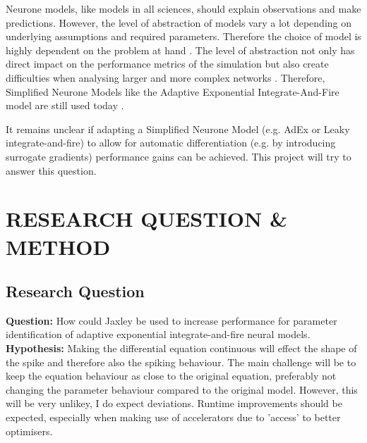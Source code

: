 \documentclass[11pt,a4paper]{article}
\begin{document}
Neurone models, like models in all sciences, should explain observations and make predictions. However, the level of abstraction of models vary a lot depending on underlying assumptions and required parameters.
Therefore the choice of model is highly dependent on the problem at hand \cite{Levenstein2023}.
The level of abstraction not only has direct impact on the performance metrics of the simulation but also create difficulties when analysing larger and more complex networks \cite{Gerstner2014}. 
Therefore, Simplified Neurone Models like the Adaptive Exponential Integrate-And-Fire \cite{Naud2008} model are still used today \cite{Tesler2024}.

It remains unclear if adapting a Simplified Neurone Model  (e.g. AdEx or Leaky integrate-and-fire) to allow for automatic differentiation (e.g. by introducing surrogate gradients) performance gains can be achieved.
This project will try to answer this question.

\section{RESEARCH QUESTION \& METHOD}

\subsection*{Research Question}
\textbf{Question:} How could Jaxley be used to increase performance for parameter identification of adaptive exponential integrate-and-fire neural models.\\
\textbf{Hypothesis:} Making the differential equation continuous will effect the shape of the spike and therefore also the spiking behaviour.
The main challenge will be to keep the equation behaviour as close to the original equation, preferably not changing the parameter behaviour compared to the original model.
However, this will be very unlikey, I do expect deviations.
Runtime improvements should be expected, especially when making use of accelerators due to 'access' to better optimisers.
\end{document}
